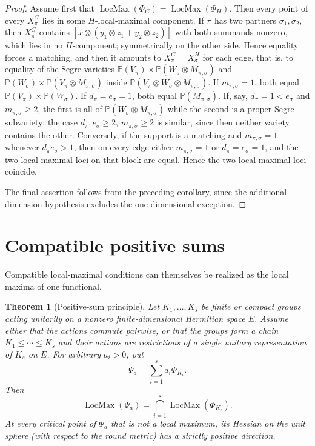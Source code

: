 \documentclass[10pt]{amsart}
\newtheorem{theorem}{Theorem}[section]
\theoremstyle{remark}
\DeclareMathOperator{\LocMax}{LocMax}
\newcommand{\PP}{\mathbb P}
\begin{document}
\begin{proof}
Assume first that $\LocMax(\Phi_G)=\LocMax(\Phi_H)$. Then every point of every
$X_\pi^G$ lies in some $H$-local-maximal component. If $\pi$ has two partners
$\sigma_1,\sigma_2$, then
$X_\pi^G$ contains $[x\otimes(y_1\otimes z_1+y_2\otimes z_2)]$ with both summands nonzero, which lies in
no $H$-component; symmetrically on the other side. Hence equality forces a matching, and then it
amounts to $X_\pi^G=X_\sigma^H$ for each edge, that is, to equality of the Segre varieties
$\PP(V_\pi)\times\PP(W_\sigma\otimes M_{\pi,\sigma})$ and
$\PP(W_\sigma)\times\PP(V_\pi\otimes M_{\pi,\sigma})$ inside
$\PP(V_\pi\otimes W_\sigma\otimes M_{\pi,\sigma})$. If $m_{\pi,\sigma}=1$, both equal
$\PP(V_\pi)\times\PP(W_\sigma)$. If $d_\pi=e_\sigma=1$, both equal $\PP(M_{\pi,\sigma})$. If, say,
$d_\pi=1<e_\sigma$ and $m_{\pi,\sigma}\ge2$, the first is all of $\PP(W_\sigma\otimes M_{\pi,\sigma})$
while the second is a proper Segre subvariety; the case $d_\pi,e_\sigma\ge2$, $m_{\pi,\sigma}\ge2$ is
similar, since then neither variety contains the other. Conversely, if the support is a matching and
$m_{\pi,\sigma}=1$ whenever $d_\pi e_\sigma>1$, then on every edge either $m_{\pi,\sigma}=1$ or
$d_\pi=e_\sigma=1$, and the two local-maximal loci on that block are equal.
Hence the two local-maximal loci coincide.

The final assertion follows from the preceding corollary,
since the additional dimension hypothesis excludes
the one-dimensional exception.
\end{proof}

\section{Compatible positive sums}\label{sec:positive-sum}

Compatible local-maximal conditions can themselves be realized as the local maxima of one functional.

\begin{theorem}[Positive-sum principle]\label{thm:positive-sum}
Let $K_1,\ldots,K_s$ be finite or compact groups acting unitarily on a nonzero finite-dimensional
Hermitian space $E$.
Assume either that the actions commute pairwise, or that
the groups form a chain $K_1\leq\cdots\leq K_s$
and their actions are restrictions of a single unitary
representation of $K_s$ on $E$.
For arbitrary $a_i>0$, put
\[
 \Psi_a=\sum_{i=1}^s a_i\Phi_{K_i}.
\]
Then
\begin{equation}\label{eq:positive-sum-locmax}
 \LocMax(\Psi_a)=\bigcap_{i=1}^s\LocMax(\Phi_{K_i}).
\end{equation}
At every critical point of $\Psi_a$ that is not a local maximum, its Hessian on the unit sphere
(with respect to the round metric) has a strictly positive direction.
\end{theorem}
\end{document}

